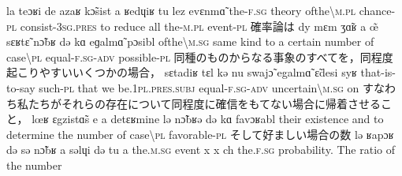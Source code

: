 \documentclass{ltjsarticle}
\newcommand\liaison{\hspace*{0.1em}\raisebox{-0.8ex}{\rotatebox{90}{(}}\hspace*{0.1em}}
\begin{document}
         {la teɔʁi de azaʁ {k\~{ɔ}sist\liaison} a ʁedɥiʁ tu {lez\liaison} evɛnm\~{ɑ}}
         {the-\textsc{f}.\textsc{sg} theory of{\textunderscore}the\textbackslash\textsc{m}.\textsc{pl} chance-\textsc{pl} consist-3\textsc{sg}.\textsc{pres} to reduce all the-\textsc{m}.\textsc{pl} event-\textsc{pl}}
         {確率論は}
         {dy mɛm ʒ\~{ɑ}ʁ a \~{œ} sɛʁt\~{ɛ} n\~{ɔ}bʁ də kɑ eɡalm\~{ɑ} pɔsibl}
         {{of{\textunderscore}the\textbackslash\textsc{m}.\textsc{sg}} same kind to a certain number of {case{\textbackslash}\textsc{pl}} equal-\textsc{f}.\textsc{sg}-\textsc{adv} possible-\textsc{pl}}
         {同種のものからなる事象のすべてを，同程度起こりやすいいくつかの場合，}
         {sɛtadiʁ tɛl kə nu swaj\~{ɔ} egalm\~{ɑ} \~{ɛ}desi syʁ}
         {that-is-to-say such-\textsc{pl} that we be.1\textsc{pl}.\textsc{pres}.\textsc{subj} equal-\textsc{f}.\textsc{sg}-\textsc{adv} {uncertain{\textbackslash}\textsc{m}.\textsc{sg}} on}
         {すなわち私たちがそれらの存在について同程度に確信をもてない場合に帰着させること，}
         {{lœʁ\liaison} ɛgzist\~{ɑ}s e a detɛʁmine lə n\~{ɔ}bʁə də kɑ favɔʁabl}
         {their existence and to determine the number of {case{\textbackslash}\textsc{pl}} favorable-\textsc{pl}}
         {そして好ましい場合の数}
         {lə ʁapɔʁ də sə {n\~{ɔ}bʁ{\liaison}} a səlɥi də tu}
         {a the.\textsc{m}.\textsc{sg} event x x ch the.\textsc{f}.\textsc{sg} probability. The ratio of the number}
         {}
\end{document}
